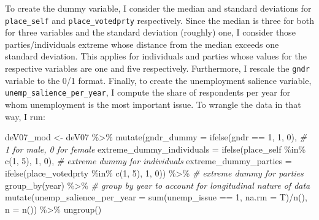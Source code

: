 \documentclass[
]{article}
\newenvironment{Shaded}{\begin{snugshade}}{\end{snugshade}}
\newcommand{\AttributeTok}[1]{\textcolor[rgb]{0.77,0.63,0.00}{#1}}
\newcommand{\CommentTok}[1]{\textcolor[rgb]{0.56,0.35,0.01}{\textit{#1}}}
\newcommand{\DecValTok}[1]{\textcolor[rgb]{0.00,0.00,0.81}{#1}}
\newcommand{\FunctionTok}[1]{\textcolor[rgb]{0.00,0.00,0.00}{#1}}
\newcommand{\NormalTok}[1]{#1}
\newcommand{\OtherTok}[1]{\textcolor[rgb]{0.56,0.35,0.01}{#1}}
\newcommand{\SpecialCharTok}[1]{\textcolor[rgb]{0.00,0.00,0.00}{#1}}
\begin{document}
To create the dummy variable, I consider the median and standard
deviations for \texttt{place\_self} and \texttt{place\_votedprty}
respectively. Since the median is three for both for three variables and
the standard deviation (roughly) one, I consider those
parties/individuals extreme whose distance from the median exceeds one
standard deviation. This applies for individuals and parties whose
values for the respective variables are one and five respectively.
Furthermore, I rescale the \texttt{gndr} variable to the 0/1 format.
Finally, to create the unemployment salience variable,
\texttt{unemp\_salience\_per\_year}, I compute the share of respondents
per year for whom unemployment is the most important issue. To wrangle
the data in that way, I run:

\begin{Shaded}
\begin{Highlighting}[]
\NormalTok{deV07\_mod }\OtherTok{\textless{}{-}}\NormalTok{ deV07 }\SpecialCharTok{\%\textgreater{}\%}
  \FunctionTok{mutate}\NormalTok{(}\AttributeTok{gndr\_dummy =} \FunctionTok{ifelse}\NormalTok{(gndr }\SpecialCharTok{==} \DecValTok{1}\NormalTok{, }\DecValTok{1}\NormalTok{, }\DecValTok{0}\NormalTok{), }\CommentTok{\# 1 for male, 0 for female}
         \AttributeTok{extreme\_dummy\_individuals =} \FunctionTok{ifelse}\NormalTok{(place\_self }\SpecialCharTok{\%in\%} \FunctionTok{c}\NormalTok{(}\DecValTok{1}\NormalTok{, }\DecValTok{5}\NormalTok{), }\DecValTok{1}\NormalTok{, }\DecValTok{0}\NormalTok{), }\CommentTok{\# extreme dummy for individuals}
         \AttributeTok{extreme\_dummy\_parties =} \FunctionTok{ifelse}\NormalTok{(place\_votedprty }\SpecialCharTok{\%in\%} \FunctionTok{c}\NormalTok{(}\DecValTok{1}\NormalTok{, }\DecValTok{5}\NormalTok{), }\DecValTok{1}\NormalTok{, }\DecValTok{0}\NormalTok{)) }\SpecialCharTok{\%\textgreater{}\%} \CommentTok{\# extreme dummy for parties }
  \FunctionTok{group\_by}\NormalTok{(year) }\SpecialCharTok{\%\textgreater{}\%} \CommentTok{\# group by year to account for longitudinal nature of data}
  \FunctionTok{mutate}\NormalTok{(}\AttributeTok{unemp\_salience\_per\_year =} \FunctionTok{sum}\NormalTok{(unemp\_issue }\SpecialCharTok{==} \DecValTok{1}\NormalTok{, }\AttributeTok{na.rm =}\NormalTok{ T)}\SpecialCharTok{/}\FunctionTok{n}\NormalTok{(), }
         \AttributeTok{n =} \FunctionTok{n}\NormalTok{()) }\SpecialCharTok{\%\textgreater{}\%}
  \FunctionTok{ungroup}\NormalTok{()}
\end{Highlighting}
\end{Shaded}
\end{document}
